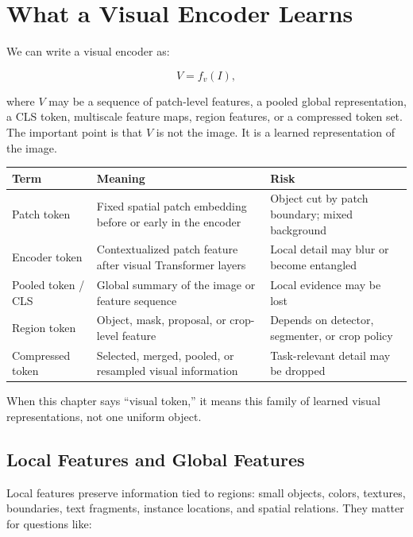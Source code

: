 \section{What a Visual Encoder Learns}
\label{sec:ch23-what-encoder-learns}

We can write a visual encoder as:

\[
V = f_v(I),
\]

where $V$ may be a sequence of patch-level features, a pooled global representation, a CLS token, multiscale feature maps, region features, or a compressed token set. The important point is that $V$ is not the image. It is a learned representation of the image.

\begin{center}
\small
\begin{tabularx}{\textwidth}{@{}p{3.0cm}p{5.6cm}X@{}}
\toprule
\textbf{Term} & \textbf{Meaning} & \textbf{Risk} \\
\midrule
Patch token & Fixed spatial patch embedding before or early in the encoder & Object cut by patch boundary; mixed background \\
Encoder token & Contextualized patch feature after visual Transformer layers & Local detail may blur or become entangled \\
Pooled token / CLS & Global summary of the image or feature sequence & Local evidence may be lost \\
Region token & Object, mask, proposal, or crop-level feature & Depends on detector, segmenter, or crop policy \\
Compressed token & Selected, merged, pooled, or resampled visual information & Task-relevant detail may be dropped \\
\bottomrule
\end{tabularx}
\end{center}

When this chapter says ``visual token,'' it means this family of learned visual representations, not one uniform object.

\subsection{Local Features and Global Features}

Local features preserve information tied to regions: small objects, colors, textures, boundaries, text fragments, instance locations, and spatial relations. They matter for questions like:

